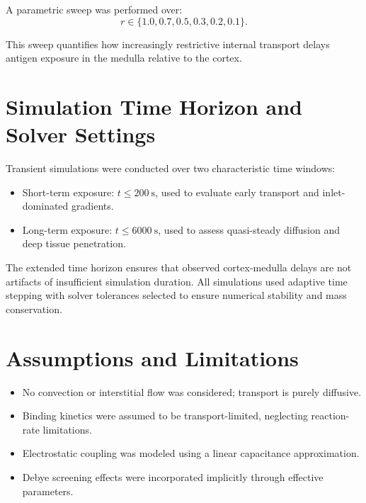 \documentclass[12pt,a4paper]{report}
\begin{document}
A parametric sweep was performed over:
\[
r \in \{1.0, 0.7, 0.5, 0.3, 0.2, 0.1\}.
\]

This sweep quantifies how increasingly restrictive internal transport delays antigen exposure in the medulla relative to the cortex.


\section{Simulation Time Horizon and Solver Settings}

Transient simulations were conducted over two characteristic time windows:
\begin{itemize}
    \item Short-term exposure: $t \leq 200~\text{s}$, used to evaluate early transport and inlet-dominated gradients.
    \item Long-term exposure: $t \leq 6000~\text{s}$, used to assess quasi-steady diffusion and deep tissue penetration.
\end{itemize}

The extended time horizon ensures that observed cortex-medulla delays are not artifacts of insufficient simulation duration. All simulations used adaptive time stepping with solver tolerances selected to ensure numerical stability and mass conservation.

\section{Assumptions and Limitations}

\begin{itemize}
    \item No convection or interstitial flow was considered; transport is purely diffusive.
    \item Binding kinetics were assumed to be transport-limited, neglecting reaction-rate limitations.
    \item Electrostatic coupling was modeled using a linear capacitance approximation.
    \item Debye screening effects were incorporated implicitly through effective parameters.
\end{itemize}

 
\end{document}
